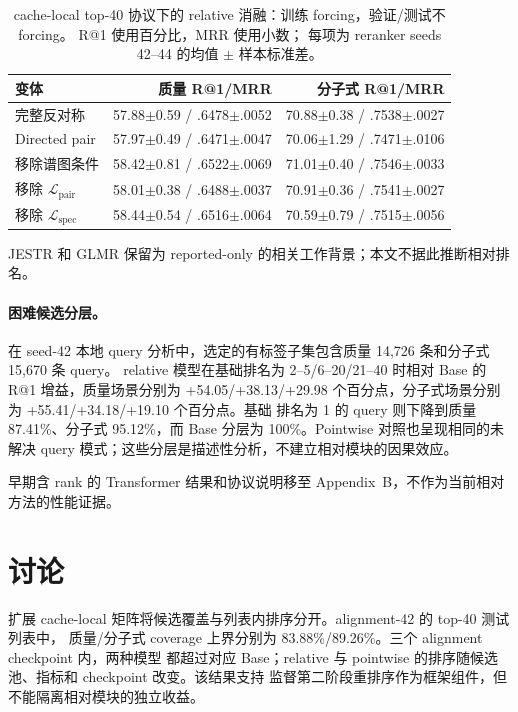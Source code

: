 \documentclass[UTF8,11pt]{ctexart}
\begin{document}
\begin{table}[t]
  \centering
  \caption{cache-local top-40 协议下的 relative 消融：训练 forcing，验证/测试不 forcing。
  R@1 使用百分比，MRR 使用小数；
  每项为 reranker seeds 42--44 的均值 $\pm$ 样本标准差。}
  \label{tab:relative_ablations_cn}
  \scriptsize
  \setlength{\tabcolsep}{2pt}
  \begin{tabular}{@{}lrr@{}}
    \toprule
    变体 & 质量 R@1/MRR & 分子式 R@1/MRR \\
    \midrule
    完整反对称 & 57.88$\pm$0.59 / .6478$\pm$.0052 & 70.88$\pm$0.38 / .7538$\pm$.0027 \\
    Directed pair & 57.97$\pm$0.49 / .6471$\pm$.0047 & 70.06$\pm$1.29 / .7471$\pm$.0106 \\
    移除谱图条件 & 58.42$\pm$0.81 / .6522$\pm$.0069 & 71.01$\pm$0.40 / .7546$\pm$.0033 \\
    移除 $\mathcal{L}_{\mathrm{pair}}$ & 58.01$\pm$0.38 / .6488$\pm$.0037 & 70.91$\pm$0.36 / .7541$\pm$.0027 \\
    移除 $\mathcal{L}_{\mathrm{spec}}$ & 58.44$\pm$0.54 / .6516$\pm$.0064 & 70.59$\pm$0.79 / .7515$\pm$.0056 \\
    \bottomrule
  \end{tabular}
\end{table}

JESTR 和 GLMR 保留为 reported-only 的相关工作背景；本文不据此推断相对排名。

\paragraph{困难候选分层。}
在 seed-42 本地 query 分析中，选定的有标签子集包含质量 14,726 条和分子式 15,670 条 query。
relative 模型在基础排名为 2--5/6--20/21--40 时相对 Base 的 R@1 增益，质量场景分别为
+54.05/+38.13/+29.98 个百分点，分子式场景分别为 +55.41/+34.18/+19.10 个百分点。基础
排名为 1 的 query 则下降到质量 87.41\%、分子式 95.12\%，而 Base 分层为 100\%。Pointwise
对照也呈现相同的未解决 query 模式；这些分层是描述性分析，不建立相对模块的因果效应。

早期含 rank 的 Transformer 结果和协议说明移至 Appendix~B，不作为当前相对方法的性能证据。

\section{讨论}

扩展 cache-local 矩阵将候选覆盖与列表内排序分开。alignment-42 的 top-40 测试列表中，
质量/分子式 coverage 上界分别为 83.88\%/89.26\%。三个 alignment checkpoint 内，两种模型
都超过对应 Base；relative 与 pointwise 的排序随候选池、指标和 checkpoint 改变。该结果支持
监督第二阶段重排序作为框架组件，但不能隔离相对模块的独立收益。
\end{document}
